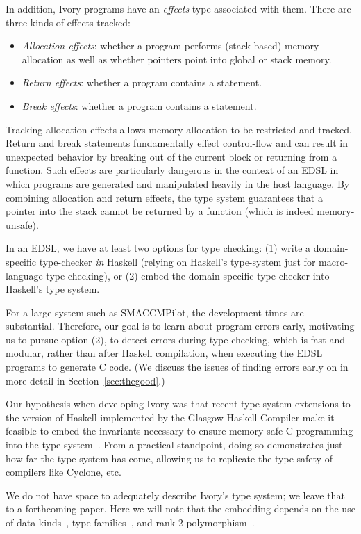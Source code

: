In addition, Ivory programs have an \emph{effects} type associated with them.
There are three kinds of effects tracked:
\begin{itemize}
  \item \emph{Allocation effects}: whether a program performs (stack-based)
    memory allocation as well as whether pointers point into global or stack memory.
  \item \emph{Return effects}: whether a program contains a  statement.
  \item \emph{Break effects}: whether a program contains a 
    statement.
\end{itemize}
\noindent
Tracking allocation effects allows memory allocation to be restricted and
tracked.  Return and break statements fundamentally effect control-flow and can
result in unexpected behavior by breaking out of the current block or returning
from a function.  Such effects are particularly dangerous in the context of an
EDSL in which programs are generated and manipulated heavily in the host
language. By combining allocation and return effects, the type system guarantees
that a pointer into the stack cannot be returned by a function (which is indeed
memory-unsafe).

In an EDSL, we have at least two options for type checking: (1) write a
domain-specific type-checker \emph{in} Haskell (relying on Haskell's type-system
just for macro-language type-checking), or (2) embed the domain-specific type
checker into Haskell's type system.

For a large system such as SMACCMPilot, the development times are substantial.
Therefore, our goal is to learn about program errors early, motivating us to
pursue option (2), to detect errors during type-checking, which is fast and
modular, rather than after Haskell compilation, when executing the EDSL programs
to generate C code.  (We discuss the issues of finding errors early on in more
detail in Section~\ref{sec:thegood}.)

Our hypothesis when developing Ivory was that recent type-system extensions to
the version of Haskell implemented by the Glasgow Haskell Compiler make it
feasible to embed the invariants necessary to ensure memory-safe C programming
into the type system~\cite{dephaskell}.  From a practical standpoint, doing so
demonstrates just how far the type-system has come, allowing us to replicate the
type safety of compilers like Cyclone, etc.

We do not have space to adequately describe Ivory's type system; we leave that
to a forthcoming paper.  Here we will note that the embedding depends on the use
of data kinds~\cite{datakinds}, type families~\cite{typefamilies}, and rank-2
polymorphism~\cite{stmonad}.

